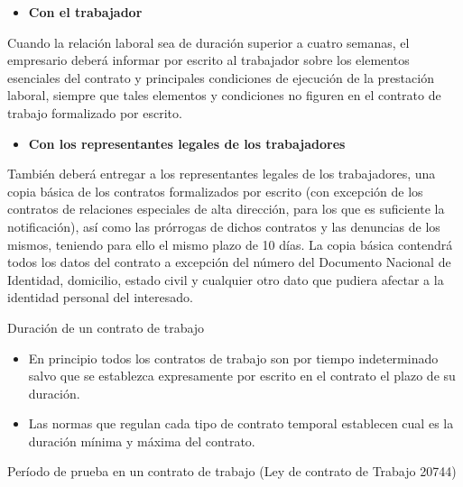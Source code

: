 \begin{itemize}
  \item \textbf{Con el trabajador}
\end{itemize}
Cuando la relación laboral sea de duración superior a cuatro semanas, el empresario deberá informar por escrito al trabajador sobre los elementos esenciales del contrato y principales condiciones de ejecución de la prestación laboral, siempre que tales elementos y condiciones no figuren en el contrato de trabajo formalizado por escrito.

\begin{itemize}
  \item \textbf{Con los representantes legales de los trabajadores}
\end{itemize}


También deberá entregar a los representantes legales de los trabajadores, una copia básica de los contratos formalizados por escrito (con excepción de los contratos de relaciones especiales de alta dirección, para los que es suficiente la notificación), así como las prórrogas de dichos contratos y las denuncias de los mismos, teniendo para ello el mismo plazo de 10 días. La copia básica contendrá todos los datos del contrato a excepción del número del Documento Nacional de Identidad, domicilio, estado civil y cualquier otro dato que pudiera afectar a la identidad personal del interesado.

Duración de un contrato de trabajo

\begin{itemize}
  \item En principio todos los contratos de trabajo son por tiempo indeterminado salvo que se establezca expresamente por escrito en el contrato el plazo de su duración.
  \item Las normas que regulan cada tipo de contrato temporal establecen cual es la duración mínima y máxima del contrato.
\end{itemize}
Período de prueba en un contrato de trabajo (Ley de contrato de Trabajo 20744)

